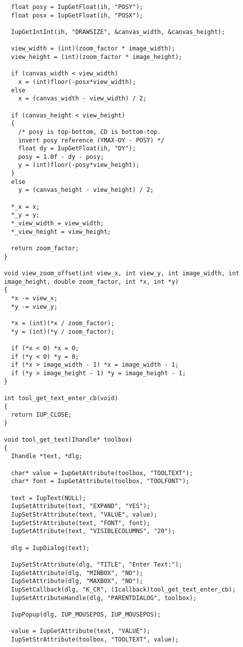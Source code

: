 \documentclass{ctexart}
\begin{document}
\begin{lstlisting}
  float posy = IupGetFloat(ih, "POSY");
  float posx = IupGetFloat(ih, "POSX");

  IupGetIntInt(ih, "DRAWSIZE", &canvas_width, &canvas_height);

  view_width = (int)(zoom_factor * image_width);
  view_height = (int)(zoom_factor * image_height);

  if (canvas_width < view_width)
    x = (int)floor(-posx*view_width);
  else
    x = (canvas_width - view_width) / 2;

  if (canvas_height < view_height)
  {
    /* posy is top-bottom, CD is bottom-top.
    invert posy reference (YMAX-DY - POSY) */
    float dy = IupGetFloat(ih, "DY");
    posy = 1.0f - dy - posy;
    y = (int)floor(-posy*view_height);
  }
  else
    y = (canvas_height - view_height) / 2;

  *_x = x;
  *_y = y;
  *_view_width = view_width;
  *_view_height = view_height;

  return zoom_factor;
}

void view_zoom_offset(int view_x, int view_y, int image_width, int image_height, double zoom_factor, int *x, int *y)
{
  *x -= view_x;
  *y -= view_y;

  *x = (int)(*x / zoom_factor);
  *y = (int)(*y / zoom_factor);

  if (*x < 0) *x = 0;
  if (*y < 0) *y = 0;
  if (*x > image_width - 1) *x = image_width - 1;
  if (*y > image_height - 1) *y = image_height - 1;
}

int tool_get_text_enter_cb(void)
{
  return IUP_CLOSE;
}

void tool_get_text(Ihandle* toolbox)
{
  Ihandle *text, *dlg;

  char* value = IupGetAttribute(toolbox, "TOOLTEXT");
  char* font = IupGetAttribute(toolbox, "TOOLFONT");

  text = IupText(NULL);
  IupSetAttribute(text, "EXPAND", "YES");
  IupSetStrAttribute(text, "VALUE", value);
  IupSetStrAttribute(text, "FONT", font);
  IupSetAttribute(text, "VISIBLECOLUMNS", "20");

  dlg = IupDialog(text);

  IupSetStrAttribute(dlg, "TITLE", "Enter Text:");
  IupSetAttribute(dlg, "MINBOX", "NO");
  IupSetAttribute(dlg, "MAXBOX", "NO");
  IupSetCallback(dlg, "K_CR", (Icallback)tool_get_text_enter_cb);
  IupSetAttributeHandle(dlg, "PARENTDIALOG", toolbox);

  IupPopup(dlg, IUP_MOUSEPOS, IUP_MOUSEPOS);

  value = IupGetAttribute(text, "VALUE");
  IupSetStrAttribute(toolbox, "TOOLTEXT", value);


\end{lstlisting}
\end{document}
